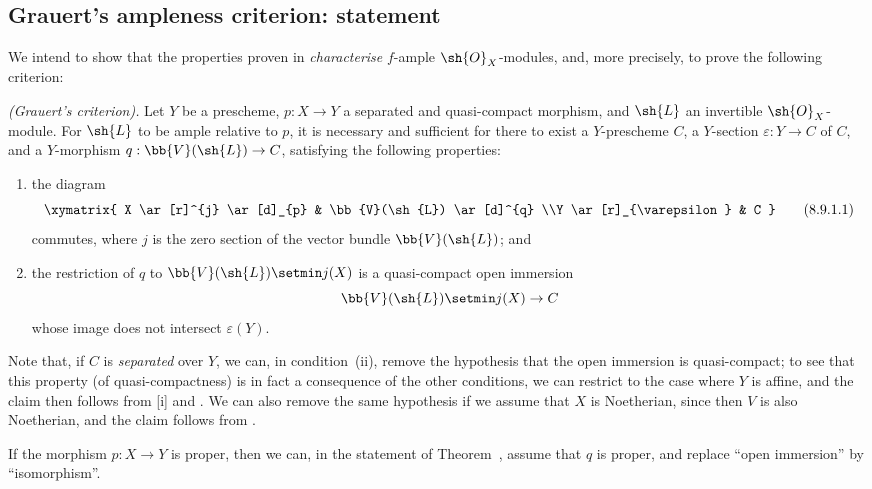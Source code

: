 \subsection{Grauert's ampleness criterion: statement}
\label{subsection:II.8.9}

We intend to show that the properties proven in  \emph{characterise} $f$-ample $\sh{O}_X$-modules, and, more precisely, to prove the following criterion:
\begin{theorem}[8.9.1]
\label{II.8.9.1}
\emph{(Grauert's criterion).}
Let $Y$ be a prescheme, $p:X\to Y$ a separated and quasi-compact morphism, and $\sh{L}$ an invertible $\sh{O}_X$-module.
For $\sh{L}$ to be ample relative to $p$, it is necessary and sufficient for there to exist a $Y$-prescheme $C$, a $Y$-section $\varepsilon:Y\to C$ of $C$, and a $Y$-morphism $q:\bb{V}(\sh{L})\to C$, satisfying the following properties:
\begin{enumerate}
  \item[\rm{(i)}] the diagram
    \[
      \label{II.8.9.1.1}
        \xymatrix{
          X
            \ar[r]^{j}
            \ar[d]_{p}
        & \bb{V}(\sh{L})
            \ar[d]^{q}
        \\Y
            \ar[r]_{\varepsilon}
        & C
        }
      \tag{8.9.1.1}
    \]
    commutes, where $j$ is the zero section of the vector bundle $\bb{V}(\sh{L})$; and
  \item[\rm{(ii)}] the restriction of $q$ to $\bb{V}(\sh{L})\setmin j(X)$ is a quasi-compact open immersion
    \[
      \bb{V}(\sh{L})\setmin j(X)\to C
    \]
    whose image does not intersect $\varepsilon(Y)$.
\end{enumerate}
\end{theorem}

Note that, if $C$ is \emph{separated} over $Y$, we can, in condition~(ii), remove the hypothesis that the open immersion is quasi-compact;
to see that this property (of quasi-compactness) is in fact a consequence of the other conditions, we can restrict to the case where $Y$ is affine, and the claim then follows from [i] and .
We can also remove
the same hypothesis if we assume that $X$ is Noetherian, since then $V$ is also Noetherian, and the claim follows from .

\begin{corollary}[8.9.2]
\label{II.8.9.2}
If the morphism $p:X\to Y$ is proper, then we can, in the statement of Theorem~, assume that $q$ is proper, and replace ``open immersion'' by ``isomorphism''.
\end{corollary}

